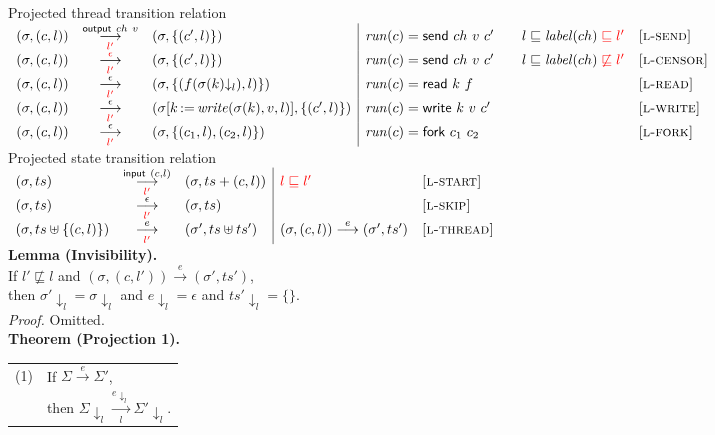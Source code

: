 \documentclass{article}
\makeatletter
\newcommand{\storeupdate}[3]{#1[#2\,{:}{=}\,#3]}
\newcommand{\startrules}{\begin{array}{l@{~{,}~}lcl@{~{,}~}l|ll}}
\newcommand{\finishrules}{\end{array}}
\newcommand{\rn}[1]{\text{\textsc{[#1]}}}
\newcommand{\steprule}[5]{%
      \multicolumn{2}{l}{ #3 }
    &
      {#4}
    &
      \multicolumn{2}{l|}{ #5 }
    &
      #2
    &
      \rn{#1}
  \\%
}
\newcommand{\tsteparrow}[1]{\overset{#1}{\longrightarrow}}
\newcommand{\tstep}[3]{#2\tsteparrow{#1}#3}
\newcommand{\ssteparrow}[1]{\overset{#1}{\longrightarrow}}
\newcommand{\sstep}[3]{#2\ssteparrow{#1}#3}
\newcommand{\ltsteparrow}[2]{\overset{#2}{\underset{#1}{\longrightarrow}}}
\newcommand{\ltstep}[4]{#3\ltsteparrow{#1}{#2}#4}
\newcommand{\ltsteprule}[6]{\steprule{#1}{#2}{#5}{\ltsteparrow{#3}{#4}}{#6}}
\newcommand{\lssteparrow}[2]{\overset{#2}{\underset{#1}{\longrightarrow}}}
\newcommand{\lsstep}[4]{#3\lssteparrow{#1}{#2}#4}
\newcommand{\lssteprule}[6]{\steprule{#1}{#2}{#5}{\lssteparrow{#3}{#4}}{#6}}
\newcommand{\replace}[3]{\storeupdate{#1}{#2}{#3}}
\newcommand{\upd}[3]{\replace{#1}{#2}{#3}}
\newcommand{\s}[1]{\text{\textit{#1}}}
\newcommand{\thread}[2]{(#1,#2)}
\newcommand{\opread}[2]{\textsf{read}~#1~#2}
\newcommand{\opwrite}[3]{\textsf{write}~#1~#2~#3}
\newcommand{\opsend}[3]{\textsf{send}~#1~#2~#3}
\newcommand{\opfork}[2]{\textsf{fork}~#1~#2}
\newcommand{\evstart}[1]{\textsf{input}~#1}
\newcommand{\evsend}[2]{\textsf{output}~#1~#2}
\newcommand{\proj}[2]{#1{\downarrow_{#2}}}
\makeatother
\begin{document}
\newpage
\noindent
%
%
\fbox{$\ltstep{l}{e}{(\sigma,t)}{\Sigma}$} Projected thread transition relation
\\
$\startrules
  \ltsteprule{l-send}
        {\s{run}(c)=\opsend{ch}{v}{c'}\qquad l\sqsubseteq\s{label}(ch){\color{red}{}\sqsubseteq l'}}
        {{\color{red}l'}}
        {\evsend{ch}{v}}
        {(\sigma,\thread{c}{l})}
        {(\sigma,\{\thread{c'}{l}\})}
  \ltsteprule{l-censor}
        {\s{run}(c)=\opsend{ch}{v}{c'}\qquad l\sqsubseteq\s{label}(ch){\color{red}{}\not\sqsubseteq l'}}
        {{\color{red}l'}}
        {{\color{red}\epsilon}}
        {(\sigma,\thread{c}{l})}
        {(\sigma,\{\thread{c'}{l}\})}
  \ltsteprule{l-read}
        {\s{run}(c)=\opread{k}{f}}
        {{\color{red}l'}}
        {\epsilon}
        {(\sigma,\thread{c}{l})}
        {(\sigma,\{\thread{f(\proj{\sigma(k)}{l})}{l}\})}
  \ltsteprule{l-write}
        {\s{run}(c)=\opwrite{k}{v}{c'}}
        {{\color{red}l'}}
        {\epsilon}
        {(\sigma,\thread{c}{l})}
        {(\upd{\sigma}{k}{\s{write}(\sigma(k),v,l)},\{\thread{c'}{l}\})}
  \ltsteprule{l-fork}
        {\s{run}(c) = \opfork{c_1}{c_2}}
        {{\color{red}l'}}
        {\epsilon}
        {(\sigma,\thread{c}{l})}
        {(\sigma,\{\thread{c_1}{l},\thread{c_2}{l}\})}
\finishrules$
\\
\fbox{$\lsstep{l}{e}{\Sigma}{\Sigma}$} Projected state transition relation
\\
$\startrules
  \lssteprule{l-start}
        {{\color{red}l\sqsubseteq l'}}
        {{\color{red}l'}}
        {\evstart{\thread{c}{l}}}
        {(\sigma, ts)}
        {(\sigma, ts+\thread{c}{l})}
  \lssteprule{l-skip}
        {}
        {{\color{red}l'}}
        {\epsilon}
        {(\sigma,ts)}
        {(\sigma,ts)}
  \lssteprule{l-thread}
        {\tstep{e}{(\sigma,\thread{c}{l})}{(\sigma',ts')}}
        {{\color{red}l'}}
        {e}
        {(\sigma,ts\uplus\{\thread{c}{l}\})}
        {(\sigma',ts\uplus ts')}
\finishrules$
\\
\textbf{Lemma (Invisibility).}
\\
If $l'\not\sqsubseteq l$
and $\tstep{e}{(\sigma,\thread{c}{l'})}{(\sigma',ts')}$,
\\
then $\proj{\sigma'}{l}=\proj{\sigma}{l}$
and $\proj{e}{l}=\epsilon$
and $\proj{ts'}{l}=\{\}$.
\\
\textit{Proof.}
Omitted.
\\
\textbf{Theorem (Projection 1).}
\\
\begin{tabular}{l@{$\qquad$}l}
  (1) & If $\sstep{e}{\Sigma}{\Sigma'}$,
\\
      & then $\lsstep{l}{\proj{e}{l}}{\proj{\Sigma}{l}}{\proj{\Sigma'}{l}}$.
\end{tabular}
\end{document}
